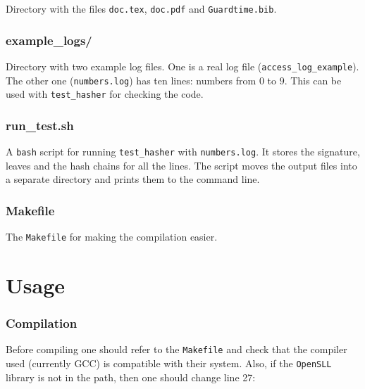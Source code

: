 \documentclass[11pt]{article}
\newcommand{\ct}[1]{\texttt{#1}}
\begin{document}
Directory with the files \ct{doc.tex}, \ct{doc.pdf} and \ct{Guardtime.bib}. 


\subsubsection*{example\_logs/} %
\label{ssub:example_logs_}

Directory with two example log files. One is a real log file (\ct{access\_log\_example}). The other one (\ct{numbers.log}) has ten lines: numbers from $0$ to $9$. This can be used with \ct{test\_hasher} for checking the code.


\subsubsection*{run\_test.sh} %
\label{ssub:run_test_sh}

A \ct{bash} script for running \ct{test\_hasher} with \ct{numbers.log}. It stores the signature, leaves and the hash chains for all the lines. The script moves the output files into a separate directory and prints them to the command line. 


\subsubsection*{Makefile} %
\label{ssub:makefile}

The \ct{Makefile} for making the compilation easier.



\section{Usage} %
\label{sec:usage}

\subsubsection{Compilation} %
\label{ssub:compilation}

Before compiling one should refer to the \ct{Makefile} and check that the compiler used (currently GCC) is compatible with their system. Also, if the \ct{OpenSLL} library is not in the path, then one should change line 27: 
\end{document}
